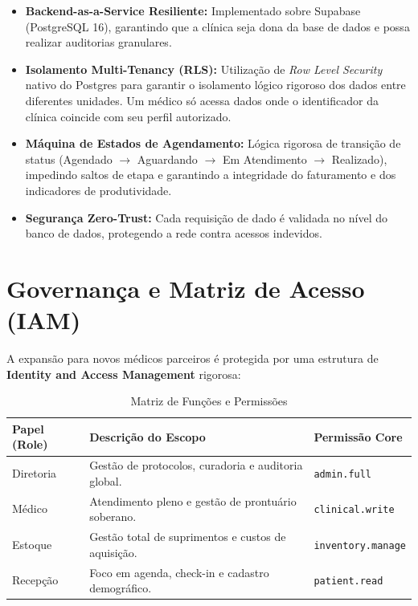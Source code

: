 \documentclass[11pt,a4paper,oneside]{article}
\begin{document}
\begin{itemize}
    \item \textbf{Backend-as-a-Service Resiliente:} Implementado sobre Supabase (PostgreSQL 16), garantindo que a clínica seja dona da base de dados e possa realizar auditorias granulares.
    \item \textbf{Isolamento Multi-Tenancy (RLS):} Utilização de \textit{Row Level Security} nativo do Postgres para garantir o isolamento lógico rigoroso dos dados entre diferentes unidades. Um médico só acessa dados onde o identificador da clínica coincide com seu perfil autorizado.
    \item \textbf{Máquina de Estados de Agendamento:} Lógica rigorosa de transição de status (Agendado $\rightarrow$ Aguardando $\rightarrow$ Em Atendimento $\rightarrow$ Realizado), impedindo saltos de etapa e garantindo a integridade do faturamento e dos indicadores de produtividade.
    \item \textbf{Segurança Zero-Trust:} Cada requisição de dado é validada no nível do banco de dados, protegendo a rede contra acessos indevidos.
\end{itemize}

\section{Governança e Matriz de Acesso (IAM)}
A expansão para novos médicos parceiros é protegida por uma estrutura de \textbf{Identity and Access Management} rigorosa:

\begin{table}[h!]
\centering
\caption{Matriz de Funções e Permissões}
\vspace{0.3cm}
\begin{tabularx}{\textwidth}{@{}lXl@{}}
\toprule
\textbf{Papel (Role)} & \textbf{Descrição do Escopo} & \textbf{Permissão Core} \\ \midrule
\textcolor{MedBlue}{Diretoria} & Gestão de protocolos, curadoria e auditoria global. & \texttt{admin.full} \\
\textcolor{MedBlue}{Médico} & Atendimento pleno e gestão de prontuário soberano. & \texttt{clinical.write} \\
\textcolor{MedBlue}{Estoque} & Gestão total de suprimentos e custos de aquisição. & \texttt{inventory.manage} \\
\textcolor{MedBlue}{Recepção} & Foco em agenda, check-in e cadastro demográfico. & \texttt{patient.read} \\ \bottomrule
\end{tabularx}
\end{table}
\end{document}
